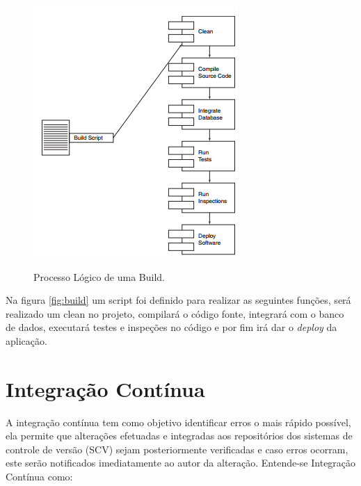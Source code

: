 \begin{figure}[h]
\centering
\caption[Processo Lógico de uma Build]{Processo Lógico de uma Build.}
\includegraphics[width=0.7\linewidth]{./images/build}
\label{fig:build}
\end{figure}
Na figura \autoref{fig:build} um script foi definido para realizar as seguintes funções, será realizado um clean no projeto, compilará o código fonte, integrará com o banco de dados, executará testes e inspeções no código e por fim irá dar o \textit{deploy} da aplicação.



\section{Integração Contínua}\label{integracaocont}
\begin{OnehalfSpace}
A integração contínua tem como objetivo identificar erros o mais rápido possível, ela permite que alterações efetuadas e integradas aos repositórios dos sistemas de controle de versão (SCV) sejam posteriormente verificadas e caso erros ocorram, este serão notificados imediatamente ao autor da alteração.
Entende-se Integração Contínua como:
\end{OnehalfSpace}

